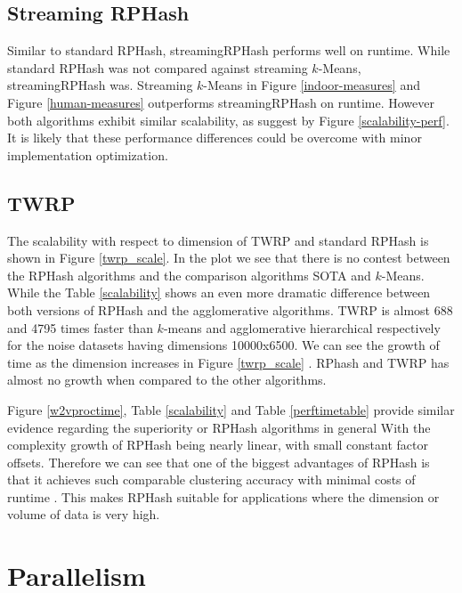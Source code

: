 \subsection{Streaming RPHash}

Similar to standard \textsf{RPHash}, \textsf{streamingRPHash} performs well on runtime.  While standard
\textsf{RPHash} was not compared against streaming $k$-Means, \textsf{streamingRPHash} was.  Streaming $k$-Means
in Figure \ref{indoor-measures} and Figure \ref{human-measures} outperforms \textsf{streamingRPHash} on
runtime.  However both algorithms exhibit similar scalability, as suggest by Figure
\ref{scalability-perf}.  It is likely that these performance differences could be overcome with
minor implementation optimization.

\subsection{TWRP}

The scalability with respect to dimension of \textsf{TWRP} and standard \textsf{RPHash} is shown in Figure
\ref{twrp_scale}.  In the plot we see that there is no contest between the \textsf{RPHash} algorithms and the
comparison algorithms SOTA and $k$-Means.  While the Table \ref{scalability} shows an even more
dramatic difference between both versions of \textsf{RPHash} and the agglomerative algorithms.  \textsf{TWRP} is
almost 688 and 4795 times faster than $k$-means and agglomerative hierarchical respectively for the
noise datasets having dimensions 10000x6500. We can see the growth of time as the dimension
increases in Figure \ref{twrp_scale} . RPhash and \textsf{TWRP} has almost no growth when compared to the
other algorithms.

Figure \ref{w2vproctime}, Table \ref{scalability} and Table \ref{perftimetable} provide similar evidence
regarding the superiority or \textsf{RPHash} algorithms in general
With the complexity growth of \textsf{RPHash} being nearly linear, with small constant factor offsets.
Therefore we can see that one of the biggest advantages of \textsf{RPHash} is that it achieves such
comparable clustering accuracy with minimal costs of runtime . This makes \textsf{RPHash} suitable for
applications where the dimension or volume of data is very high.

\section{Parallelism}


